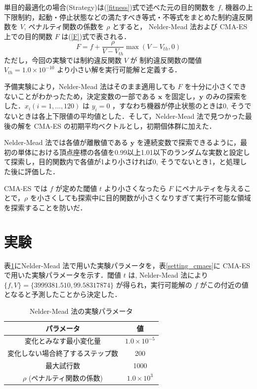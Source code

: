 \documentclass[twocolumn]{jarticle}
\begin{document}
単目的最適化の場合(Strategy)は(\ref{fitness})式で述べた元の目的関数を $f$, 機器の上下限制約，起動・停止状態などの満たすべき等式・不等式をまとめた制約違反関数を $V$, ペナルティ関数の係数を $\rho$ とすると， Nelder-Mead 法および CMA-ES 上での目的関数 $F$ は(\ref{F})式で表される．
\begin{equation}
    \label{F}
    F = f + \frac{\rho}{V-V_{th}}\max(V-V_{th}, 0)
\end{equation}
ただし，今回の実験では制約違反関数 $V$ が 制約違反関数の閾値 $V_{th} = 1.0 \times 10^{-10}$ より小さい解を実行可能解と定義する．

予備実験により，Nelder-Mead 法はそのまま適用しても $F$ を十分に小さくできないことがわかったため，決定変数の一部である $\bm{x}$ を固定し，$\bm{y}$ のみの探索をした．$x_i(i=1,\dots,120)$ は $y_i=0$ ，すなわち機器が停止状態のときは0, そうでないときは各上下限値の平均値とした．そして，Nelder-Mead 法で見つかった最後の解を CMA-ES の初期平均ベクトルとし，初期個体群に加えた．

Nelder-Mead 法では各値が離散値である $\bm{y}$ を連続変数で探索できるように，最初の単体における頂点座標の各値を0.99以上1.01以下のランダムな実数と設定して探索し，目的関数内で各値が1より小さければ0, そうでないとき1，と処理した後に評価した．

CMA-ES では $f$ が定めた閾値 $t$ より小さくなったら $F$ にペナルティを与えることで，$\rho$ を小さくしても探索中に目的関数が小さくなりすぎて実行不可能な領域を探索することを防いだ．

\section{実験}
表\ref{setting_nelder}にNelder-Mead 法で用いた実験パラメータを，表\ref{setting_cmaes}に CMA-ES で用いた実験パラメータを示す．閾値 $t$ は, Nelder-Mead 法により $\{f, V\}=\{3999381.510, 99.58317874\}$ が得られ，実行可能解の $f$ がこの付近の値となると予測したことから決定した．
\begin{table}[htbp]
    \begin{center}
        \caption{Nelder-Mead 法の実験パラメータ}
        \label{setting_nelder}
        \begin{tabular}{| c | c |} 
            \hline
            パラメータ & 値 \\ 
            \hline
            変化とみなす最小変化量 & $1.0\times10^{-5}$ \\
            変化しない場合終了するステップ数 & 200 \\
            最大試行数 & 1000 \\
            $\rho$ (ペナルティ関数の係数) & $1.0\times10^{3}$\\ 
            \hline
        \end{tabular}
    \end{center}
\end{table}
\end{document}
